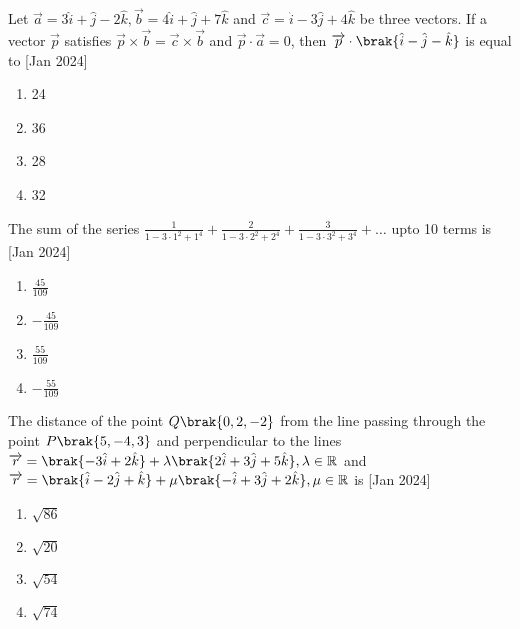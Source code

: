 \item Let $\overrightarrow{a} = 3\hat{i} + \hat{j} - 2\hat{k}, \overrightarrow{b} = 4\hat{i} + \hat{j} + 7\hat{k}$
    and $\overrightarrow{c} = \hat{i} - 3\hat{j} + 4\hat{k}$ be three vectors. If a
    vector $\overrightarrow{p}$ satisfies $\overrightarrow{p} \times \overrightarrow{b} = \overrightarrow{c} \times \overrightarrow{b}$
    and $\overrightarrow{p} \cdot \overrightarrow{a} = 0$, then $\overrightarrow{p} \cdot \brak{\hat{i} - \hat{j} - \hat{k}}$
    is equal to
    \hfill{[Jan 2024]}

    \begin{multicols}{4}
        \begin{enumerate}

            \item 24
            \item 36
            \item 28
            \item 32
        \end{enumerate}
    \end{multicols}

\item The sum of the series $\frac{1}{1-3\cdot 1^2+1^4}+\frac{2}{1-3\cdot 2^2+2^4}
    +\frac{3}{1-3\cdot 3^2+3^4} + \dots$ upto 10 terms is
    \hfill{[Jan 2024]}

    \begin{multicols}{4}
        \begin{enumerate}

            \item $\frac{45}{109}$
            \item $-\frac{45}{109}$
            \item $\frac{55}{109}$
            \item $-\frac{55}{109}$
        \end{enumerate}
    \end{multicols}

\item The distance of the point $Q\brak{0, 2, -2}$ from the line passing
    through the point $P\brak{5, -4, 3}$ and perpendicular to the lines 
    $\overrightarrow{r} = \brak{-3\hat{i} + 2\hat{k}} + \lambda\brak{2\hat{i} + 3\hat{j} + 5\hat{k}}, \lambda \in \mathbb{R}$
    and $\overrightarrow{r} = \brak{\hat{i} - 2\hat{j} + \hat{k}} + \mu\brak{-\hat{i} + 3\hat{j} + 2\hat{k}}, \mu \in \mathbb{R}$
    is
    \hfill{[Jan 2024]}

    \begin{multicols}{4}
        \begin{enumerate}

            \item $\sqrt{86}$
            \item $\sqrt{20}$
            \item $\sqrt{54}$
            \item $\sqrt{74}$
        \end{enumerate}
    \end{multicols}

